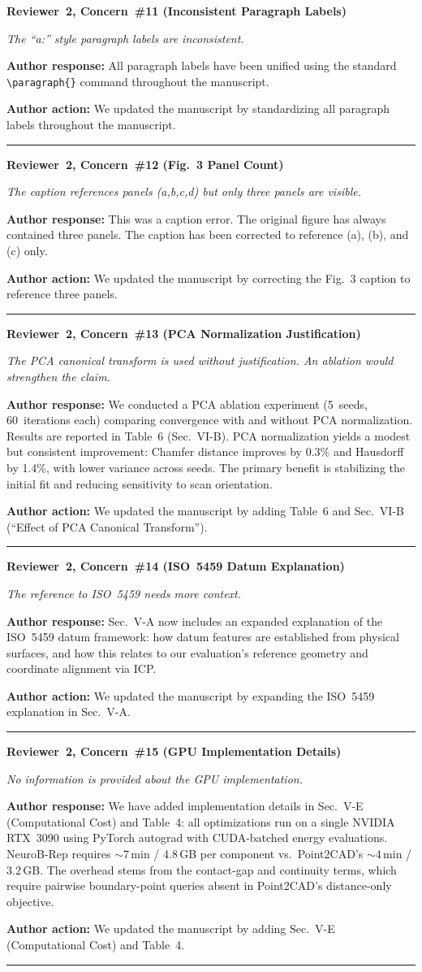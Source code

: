 \documentclass[11pt]{article}
\newcommand{\concern}[2]{\noindent\textbf{Reviewer~#1, Concern~\##2}\par}
\newcommand{\concerntext}[1]{\noindent\textit{#1}\par\medskip}
\newcommand{\authorresponse}[1]{\noindent\textbf{Author response:} #1\par\medskip}
\newcommand{\authoraction}[1]{\noindent\textbf{Author action:} We updated the manuscript by #1\par\bigskip\noindent\rule{\linewidth}{0.4pt}\par\medskip}
\begin{document}
\concern{2}{11 (Inconsistent Paragraph Labels)}
\concerntext{The ``a:'' style paragraph labels are inconsistent.}
\authorresponse{All paragraph labels have been unified using the standard
\texttt{\textbackslash paragraph\{\}} command throughout the manuscript.}
\authoraction{standardizing all paragraph labels throughout the manuscript.}

\concern{2}{12 (Fig.~3 Panel Count)}
\concerntext{The caption references panels (a,b,c,d) but only three
panels are visible.}
\authorresponse{This was a caption error. The original figure has always
contained three panels. The caption has been corrected to
reference (a), (b), and (c) only.}
\authoraction{correcting the Fig.~3 caption to reference three panels.}

\concern{2}{13 (PCA Normalization Justification)}
\concerntext{The PCA canonical transform is used without justification.
An ablation would strengthen the claim.}
\authorresponse{We conducted a PCA ablation experiment (5~seeds, 60~iterations
each) comparing convergence with and without PCA normalization.
Results are reported in Table~6 (Sec.~VI-B). PCA normalization
yields a modest but consistent improvement: Chamfer distance
improves by 0.3\% and Hausdorff by 1.4\%, with lower variance
across seeds. The primary benefit is stabilizing the initial
fit and reducing sensitivity to scan orientation.}
\authoraction{adding Table~6 and Sec.~VI-B (``Effect of PCA Canonical Transform'').}

\concern{2}{14 (ISO~5459 Datum Explanation)}
\concerntext{The reference to ISO~5459 needs more context.}
\authorresponse{Sec.~V-A now includes an expanded explanation of the
ISO~5459 datum framework: how datum features are established
from physical surfaces, and how this relates to our
evaluation's reference geometry and coordinate alignment via ICP.}
\authoraction{expanding the ISO~5459 explanation in Sec.~V-A.}

\concern{2}{15 (GPU Implementation Details)}
\concerntext{No information is provided about the GPU implementation.}
\authorresponse{We have added implementation details in Sec.~V-E
(Computational Cost) and Table~4: all optimizations run on a
single NVIDIA RTX~3090 using PyTorch autograd with CUDA-batched
energy evaluations. NeuroB-Rep requires ${\sim}7$\,min / 4.8\,GB
per component vs.\ Point2CAD's ${\sim}4$\,min / 3.2\,GB.
The overhead stems from the contact-gap and continuity terms,
which require pairwise boundary-point queries absent in
Point2CAD's distance-only objective.}
\authoraction{adding Sec.~V-E (Computational Cost) and Table~4.}
\end{document}
